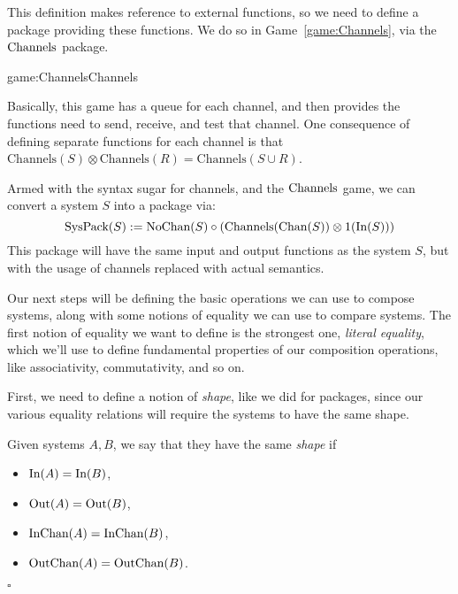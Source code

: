This definition makes reference to external functions,
so we need to define a package providing these functions.
We do so in Game~\ref{game:Channels},
via the $\text{Channels}$ package.

\begin{game}{game:Channels}{Channels}
\end{game}

Basically, this game has a queue for each channel, and then provides
the functions need to send, receive, and test that channel.
One consequence of defining separate functions for each channel
is that $\text{Channels}(S) \otimes \text{Channels}(R) = \text{Channels}(S \cup R)$.

Armed with the syntax sugar for channels, and the $\text{Channels}$ game,
we can convert a system $S$ into a package via:
$$
\text{SysPack}(S) := \text{NoChan}(S) \circ (\text{Channels}(\text{Chan}(S)) \otimes 1(\text{In}(S)))
$$
This package will have the same input and output functions as the system $S$,
but with the usage of channels replaced with actual semantics.

Our next steps will be defining the basic operations we can use
to compose systems, along with some notions of equality we
can use to compare systems.
The first notion of equality we want to define is the strongest
one, \emph{literal equality}, 
which we'll use to define fundamental properties of our composition
operations, like associativity, commutativity, and so on.

First, we need to define a notion of \emph{shape}, like we did
for packages, since our various equality relations will
require the systems to have the same shape.

\begin{definition}
  Given systems $A, B$, we say that they have the same \emph{shape} if
  \begin{itemize}
    \item $\text{In}(A) = \text{In}(B)$,
    \item $\text{Out}(A) = \text{Out}(B)$,
    \item $\text{InChan}(A) = \text{InChan}(B)$,
    \item $\text{OutChan}(A) = \text{OutChan}(B)$.
  \end{itemize}

  $\square$
\end{definition}

